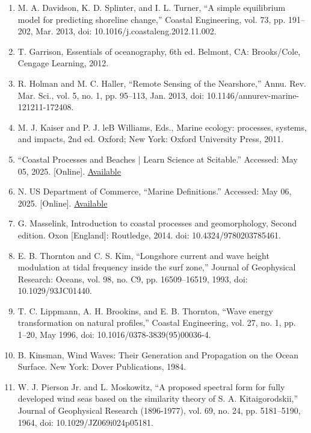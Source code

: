 \documentclass{article}
\begin{document}
{\begin{enumerate}
    \item {M. A. Davidson, K. D. Splinter, and I. L. Turner, “A simple equilibrium model for predicting shoreline change,” Coastal Engineering, vol. 73, pp. 191–202, Mar. 2013, doi: 10.1016/j.coastaleng.2012.11.002.}

    \item {T. Garrison, Essentials of oceanography, 6th ed. Belmont, CA: Brooks/Cole, Cengage Learning, 2012.}

    \item {R. Holman and M. C. Haller, “Remote Sensing of the Nearshore,” Annu. Rev. Mar. Sci., vol. 5, no. 1, pp. 95–113, Jan. 2013, doi: 10.1146/annurev-marine-121211-172408.}

    \item {M. J. Kaiser and P. J. leB Williams, Eds., Marine ecology: processes, systems, and impacts, 2nd ed. Oxford; New York: Oxford University Press, 2011.}

    \item {“Coastal Processes and Beaches | Learn Science at Scitable.” Accessed: May 05, 2025. [Online]. \href{https://www.nature.com/scitable/knowledge/library/coastal-processes-and-beaches-26276621/}{Available}}

    \item {N. US Department of Commerce, “Marine Definitions.” Accessed: May 06, 2025. [Online]. \href{https://www.weather.gov/gum/MarineDefinitions}{Available}}

    \item {G. Masselink, Introduction to coastal processes and geomorphology, Second edition. Oxon [England]: Routledge, 2014. doi: 10.4324/9780203785461.}

    \item {E. B. Thornton and C. S. Kim, “Longshore current and wave height modulation at tidal frequency inside the surf zone,” Journal of Geophysical Research: Oceans, vol. 98, no. C9, pp. 16509–16519, 1993, doi: 10.1029/93JC01440.}

    \item {T. C. Lippmann, A. H. Brookins, and E. B. Thornton, “Wave energy transformation on natural profiles,” Coastal Engineering, vol. 27, no. 1, pp. 1–20, May 1996, doi: 10.1016/0378-3839(95)00036-4.}

    \item {B. Kinsman, Wind Waves: Their Generation and Propagation on the Ocean Surface. New York: Dover Publications, 1984.}

    \item {W. J. Pierson Jr. and L. Moskowitz, “A proposed spectral form for fully developed wind seas based on the similarity theory of S. A. Kitaigorodskii,” Journal of Geophysical Research (1896-1977), vol. 69, no. 24, pp. 5181–5190, 1964, doi: 10.1029/JZ069i024p05181.}


\end{enumerate}}
\end{document}
